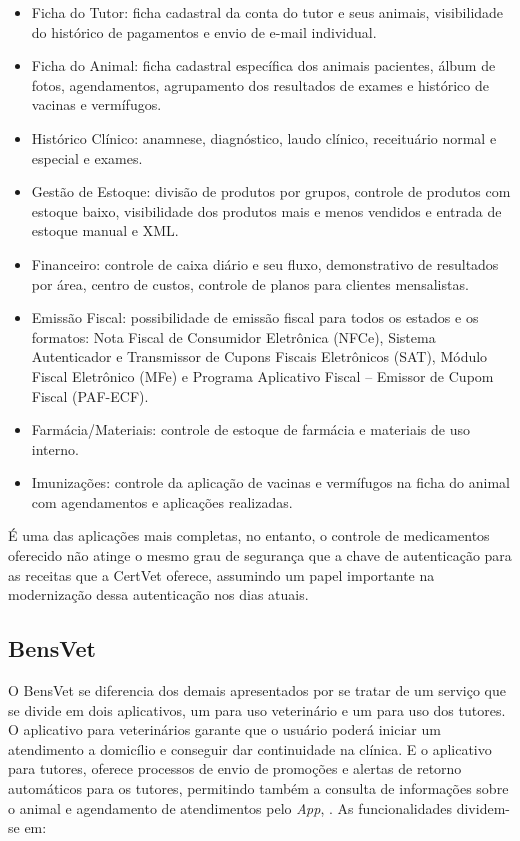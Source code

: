 \documentclass[
    12pt,               %
    openright,          %
    oneside,
    a4paper,            %
    BIBLATEX,           %
    TODO,               %
    english,            %
    brazil              %
    ]{ifsp-spo-inf-ctds}
\begin{document}
\begin{itemize}
    \item Ficha do Tutor: ficha cadastral da conta do tutor e seus animais, visibilidade do histórico de pagamentos e envio de e-mail individual.
    \item Ficha do Animal: ficha cadastral específica dos animais pacientes, álbum de fotos, agendamentos, agrupamento dos resultados de exames e histórico de vacinas e vermífugos.
    \item Histórico Clínico: anamnese, diagnóstico, laudo clínico, receituário normal e especial e exames.
    \item Gestão de Estoque: divisão de produtos por grupos, controle de produtos com estoque baixo, visibilidade dos produtos mais e menos vendidos e entrada de estoque manual e XML.
    \item Financeiro: controle de caixa diário e seu fluxo, demonstrativo de resultados por área, centro de custos, controle de planos para clientes mensalistas.
    \item Emissão Fiscal: possibilidade de emissão fiscal para todos os estados e os formatos: Nota Fiscal de Consumidor Eletrônica (NFCe), Sistema Autenticador e Transmissor de Cupons Fiscais Eletrônicos (SAT), Módulo Fiscal Eletrônico (MFe) e Programa Aplicativo Fiscal – Emissor de Cupom Fiscal (PAF-ECF).
    \item Farmácia/Materiais: controle de estoque de farmácia e materiais de uso interno.
    \item Imunizações: controle da aplicação de vacinas e vermífugos na ficha do animal com agendamentos e aplicações realizadas.
\end{itemize}

    É uma das aplicações mais completas, no entanto, o controle de medicamentos oferecido não atinge o mesmo grau de segurança que a chave de autenticação para as receitas que a CertVet oferece, assumindo um papel importante na modernização dessa autenticação nos dias atuais.

        \subsection{BensVet}
        O BensVet se diferencia dos demais apresentados por se tratar de um serviço que se divide em dois aplicativos, um para uso veterinário e um para uso dos tutores. O aplicativo para veterinários garante que o usuário poderá iniciar um atendimento a domicílio e conseguir  dar continuidade na clínica. E o aplicativo para tutores, oferece processos de envio  de promoções e alertas de retorno automáticos para os tutores, permitindo também a consulta de  informações sobre o animal e agendamento de atendimentos pelo \emph{App},  . As funcionalidades dividem-se em:
\end{document}
